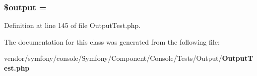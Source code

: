 \subsubsection[{\$output}]{\setlength{\rightskip}{0pt plus 5cm}\$output = \textquotesingle{}\textquotesingle{}}\label{class_symfony_1_1_component_1_1_console_1_1_tests_1_1_output_1_1_test_output_a73004ce9cd673c1bfafd1dc351134797}


Definition at line 145 of file Output\+Test.\+php.



The documentation for this class was generated from the following file\+:\begin{DoxyCompactItemize}
\item 
vendor/symfony/console/\+Symfony/\+Component/\+Console/\+Tests/\+Output/{\bf Output\+Test.\+php}\end{DoxyCompactItemize}
